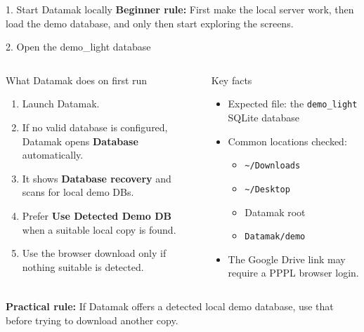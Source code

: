 \documentclass[aspectratio=169,11pt]{beamer}
\newcommand{\code}[1]{\texttt{#1}}
\begin{document}
\begin{frame}{1. Start Datamak locally}
  \smallskip
  {\footnotesize\textbf{Beginner rule:} First make the local server work, then
  load the demo database, and only then start exploring the screens.}
\end{frame}

\begin{frame}{2. Open the demo\_light database}
  \begin{columns}[T]
    \begin{block}{What Datamak does on first run}
      \small
      \begin{enumerate}
        \item Launch Datamak.
        \item If no valid database is configured, Datamak opens
        \textbf{Database} automatically.
        \item It shows \textbf{Database recovery} and scans for local demo DBs.
        \item Prefer \textbf{Use Detected Demo DB} when a suitable local copy
        is found.
        \item Use the browser download only if nothing suitable is detected.
      \end{enumerate}
    \end{block}

    \begin{alertblock}{Key facts}
      \small
      \begin{itemize}
        \item Expected file: the \code{demo\_light} SQLite database
        \item Common locations checked:
        \begin{itemize}\scriptsize
          \item \code{\textasciitilde/Downloads}
          \item \code{\textasciitilde/Desktop}
          \item Datamak root
          \item \code{Datamak/demo}
        \end{itemize}
        \item The Google Drive link may require a PPPL browser login.
      \end{itemize}
    \end{alertblock}
  \end{columns}

  \smallskip
  {\footnotesize\textbf{Practical rule:} If Datamak offers a detected local
  demo database, use that before trying to download another copy.}
\end{frame}
\end{document}
